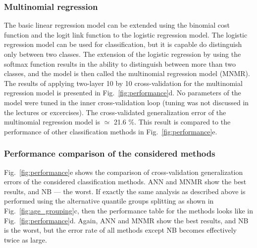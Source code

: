 \documentclass[10pt, paper=a4]{article}
\begin{document}
\subsubsection{Multinomial regression}  %
The basic linear regression model can be extended using the binomial
cost function and the logit link function to the logistic regression
model.  The logistic regression model can be used for classification,
but it is capable do distinguish only between two classes.  The
extension of the logistic regression by using the softmax function
results in the ability to distinguish between more than two classes,
and the model is then called the multinomial regression model (MNMR).
The results of applying two-layer 10 by 10 cross-validation for the
multinomial regression model is presented in
Fig.~\ref{fig:performance}d.  No parameters of the model were tuned in
the inner cross-validation loop (tuning was not discussed in the
lectures or excercises).  The cross-validated generalization error of
the multinomial regression model is $\simeq$ 21.6 \%.  This result is
compared to the performance of other classification methods in
Fig.~\ref{fig:performance}e.

\subsubsection{Performance comparison of the considered methods}
Fig.~\ref{fig:performance}e shows the comparison of cross-validation
generalization errors of the considered classification methods.  ANN
and MNMR show the best results, and NB --- the worst.  If exactly the
same analysis as described above is performed using the alternative
quantile groups splitting as shown in Fig.~\ref{fig:age_grouping}c,
then the performance table for the methods looks like in
Fig.~\ref{fig:performance}d.  Again, ANN and MNMR show the best
results, and NB is the worst, but the error rate of all methods except
NB becomes effectively twice as large.
\end{document}
